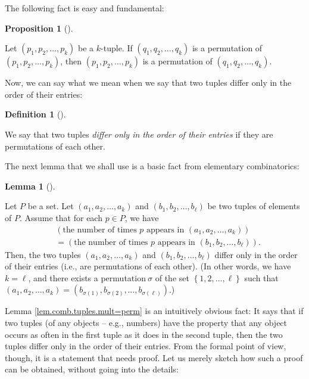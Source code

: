 \documentclass[numbers=enddot,12pt,final,onecolumn,notitlepage]{scrartcl}%
\numberwithin{exer}{subsection}
\theoremstyle{definition}
\newtheorem{lem}[theo]{Lemma}
\newenvironment{lemma}[1][]
{\begin{lem}[#1]\begin{leftbar}}
{\end{leftbar}\end{lem}}
\newtheorem{prop}[theo]{Proposition}
\newenvironment{proposition}[1][]
{\begin{prop}[#1]\begin{leftbar}}
{\end{leftbar}\end{prop}}
\newtheorem{defi}[theo]{Definition}
\newenvironment{definition}[1][]
{\begin{defi}[#1]\begin{leftbar}}
{\end{leftbar}\end{defi}}
\begin{document}
The following fact is easy and fundamental:

\begin{proposition}
Let $\left(  p_{1},p_{2},\ldots,p_{k}\right)  $ be a $k$-tuple. If $\left(
q_{1},q_{2},\ldots,q_{k}\right)  $ is a permutation of $\left(  p_{1}%
,p_{2},\ldots,p_{k}\right)  $, then $\left(  p_{1},p_{2},\ldots,p_{k}\right)
$ is a permutation of $\left(  q_{1},q_{2},\ldots,q_{k}\right)  $.
\end{proposition}

Now, we can say what we mean when we say that two tuples differ only in the
order of their entries:

\begin{definition}
We say that two tuples \textit{differ only in the order of their entries} if
they are permutations of each other.
\end{definition}

The next lemma that we shall use is a basic fact from elementary combinatorics:

\begin{lemma}
\label{lem.comb.tuples.mult=perm}Let $P$ be a set. Let $\left(  a_{1}%
,a_{2},\ldots,a_{k}\right)  $ and $\left(  b_{1},b_{2},\ldots,b_{\ell}\right)
$ be two tuples of elements of $P$. Assume that for each $p\in P$, we have%
\begin{align}
&  \left(  \text{the number of times }p\text{ appears in }\left(  a_{1}%
,a_{2},\ldots,a_{k}\right)  \right) \nonumber\\
&  =\left(  \text{the number of times }p\text{ appears in }\left(  b_{1}%
,b_{2},\ldots,b_{\ell}\right)  \right)  .
\label{eq.lem.comb.tuples.mult=perm.ass}%
\end{align}
Then, the two tuples $\left(  a_{1},a_{2},\ldots,a_{k}\right)  $ and $\left(
b_{1},b_{2},\ldots,b_{\ell}\right)  $ differ only in the order of their
entries (i.e., are permutations of each other). (In other words, we have
$k=\ell$, and there exists a permutation$\ \sigma$ of the set $\left\{
1,2,\ldots,\ell\right\}  $ such that $\left(  a_{1},a_{2},\ldots,a_{k}\right)
=\left(  b_{\sigma\left(  1\right)  },b_{\sigma\left(  2\right)  }%
,\ldots,b_{\sigma\left(  \ell\right)  }\right)  $.)
\end{lemma}

Lemma \ref{lem.comb.tuples.mult=perm} is an intuitively obvious fact: It says
that if two tuples (of any objects -- e.g., numbers) have the property that
any object occurs as often in the first tuple as it does in the second tuple,
then the two tuples differ only in the order of their entries. From the formal
point of view, though, it is a statement that needs proof. Let us merely
sketch how such a proof can be obtained, without going into the details:
\end{document}
